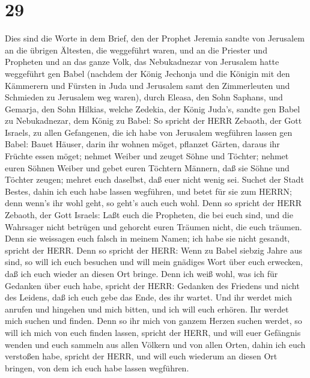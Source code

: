 \hypertarget{section-28}{%
\section{29}\label{section-28}}

 Dies sind die Worte in dem Brief, den der Prophet Jeremia
sandte von Jerusalem an die übrigen Ältesten, die weggeführt waren, und
an die Priester und Propheten und an das ganze Volk, das Nebukadnezar
von Jerusalem hatte weggeführt gen Babel  (nachdem der König
Jechonja und die Königin mit den Kämmerern und Fürsten in Juda und
Jerusalem samt den Zimmerleuten und Schmieden zu Jerusalem weg waren),
 durch Eleasa, den Sohn Saphans, und Gemarja, den Sohn
Hilkias, welche Zedekia, der König Juda's, sandte gen Babel zu
Nebukadnezar, dem König zu Babel:  So spricht der HERR
Zebaoth, der Gott Israels, zu allen Gefangenen, die ich habe von
Jerusalem wegführen lassen gen Babel:  Bauet Häuser, darin
ihr wohnen möget, pflanzet Gärten, daraus ihr Früchte essen möget;
 nehmet Weiber und zeuget Söhne und Töchter; nehmet euren
Söhnen Weiber und gebet euren Töchtern Männern, daß sie Söhne und
Töchter zeugen; mehret euch daselbst, daß euer nicht wenig sei.
 Suchet der Stadt Bestes, dahin ich euch habe lassen
wegführen, und betet für sie zum HERRN; denn wenn's ihr wohl geht, so
geht's auch euch wohl.  Denn so spricht der HERR Zebaoth,
der Gott Israels: Laßt euch die Propheten, die bei euch sind, und die
Wahrsager nicht betrügen und gehorcht euren Träumen nicht, die euch
träumen.  Denn sie weissagen euch falsch in meinem Namen;
ich habe sie nicht gesandt, spricht der HERR.  Denn so
spricht der HERR: Wenn zu Babel siebzig Jahre aus sind, so will ich euch
besuchen und will mein gnädiges Wort über euch erwecken, daß ich euch
wieder an diesen Ort bringe.  Denn ich weiß wohl, was ich
für Gedanken über euch habe, spricht der HERR: Gedanken des Friedens und
nicht des Leidens, daß ich euch gebe das Ende, des ihr wartet.
 Und ihr werdet mich anrufen und hingehen und mich bitten,
und ich will euch erhören.  Ihr werdet mich suchen und
finden. Denn so ihr mich von ganzem Herzen suchen werdet, 
so will ich mich von euch finden lassen, spricht der HERR, und will euer
Gefängnis wenden und euch sammeln aus allen Völkern und von allen Orten,
dahin ich euch verstoßen habe, spricht der HERR, und will euch wiederum
an diesen Ort bringen, von dem ich euch habe lassen wegführen.
